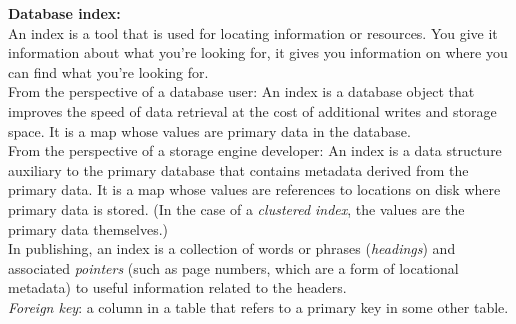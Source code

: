 \documentclass[12pt, titlepage]{article}
\begin{document}
\textbf{Database index:} \\

An index is a tool that is used for locating information or resources. You give it information about what you're looking for, it gives you information on where you can find what you're looking for. \\

From the perspective of a database user: An index is a database object that improves the speed of data retrieval at the cost of additional writes and storage space. It is a map whose values are primary data in the database. \\

From the perspective of a storage engine developer: An index is a data structure auxiliary to the primary database that contains metadata derived from the primary data. It is a map whose values are references to locations on disk where primary data is stored. (In the case of a \textit{clustered index}, the values are the primary data themselves.) \\

In publishing, an index is a collection of words or phrases (\textit{headings}) and associated \textit{pointers} (such as page numbers, which are a form of locational metadata) to useful information related to the headers. \\

\textit{Foreign key}: a column in a table that refers to a primary key in some other table.
\end{document}

